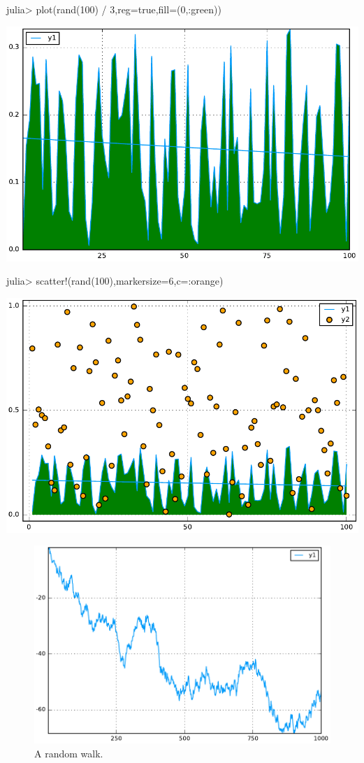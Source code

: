 \begin{juliaterm}
julia> plot(rand(100) / 3,reg=true,fill=(0,:green))


\end{juliaterm}
\includegraphics[width=\linewidth]{figures/plotsjl_test_4_1.pdf}

\begin{juliaterm}
julia> scatter!(rand(100),markersize=6,c=:orange)

\end{juliaterm}
\includegraphics[width=\linewidth]{figures/plotsjl_test_4_2.pdf}




\begin{figure}[htpb]
\center
\includegraphics[width=\linewidth]{figures/plotsjl_test_random_1.pdf}
\caption{A random walk.}
\label{fig:random}
\end{figure}
